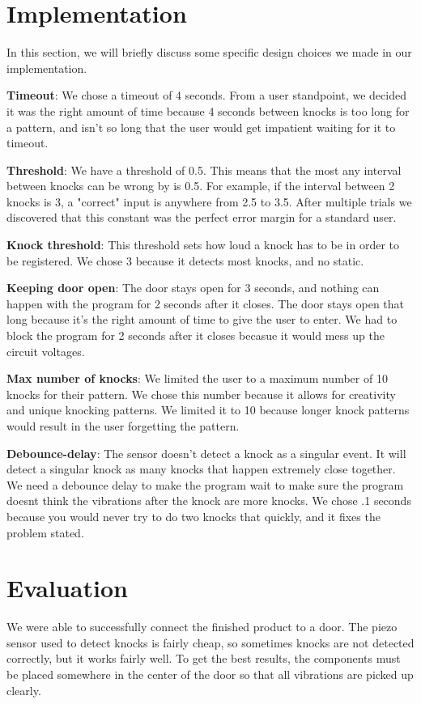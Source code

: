 \documentclass[11pt]{article}			%
\begin{document}
\section{Implementation}

In this section, we will briefly discuss some specific design choices we made in our implementation.

\textbf{Timeout}: We chose a timeout of 4 seconds. From a user standpoint, we decided it was the right amount of time because 4 seconds between knocks is too long for a pattern, and isn't so long that the user would get impatient waiting for it to timeout.

\textbf{Threshold}: We have a threshold of 0.5. This means that the most any interval between knocks can be wrong by is 0.5. For example, if the interval between 2 knocks is 3, a "correct" input is anywhere from 2.5 to 3.5. After multiple trials we discovered that this constant was the perfect error margin for a standard user.

\textbf{Knock threshold}: This threshold sets how loud a knock has to be in order to be registered. We chose 3 because it detects most knocks, and no static.

\textbf{Keeping door open}: The door stays open for 3 seconds, and nothing can happen with the program for 2 seconds after it closes. The door stays open that long because it's the right amount of time to give the user to enter. We had to block the program for 2 seconds after it closes becasue it would mess up the circuit voltages.

\textbf{Max number of knocks}: We limited the user to a maximum number of 10 knocks for their pattern. We chose this number because it allows for creativity and unique knocking patterns. We limited it to 10 because longer knock patterns would result in the user forgetting the pattern.

\textbf{Debounce-delay}: The sensor doesn't detect a knock as a singular event. It will detect a singular knock as many knocks that happen 
extremely close together. We need a debounce delay to make the program wait to make sure the program doesnt think the vibrations after the knock are more knocks. We chose .1 seconds because you would never try to do two knocks that quickly, and it fixes the problem stated.


\section{Evaluation}
We were able to successfully connect the finished product to a door.  The piezo sensor used to detect knocks is fairly cheap, so sometimes knocks are not detected correctly, but it works fairly well.  To get the best results, the components must be placed somewhere in the center of the door so that all vibrations are picked up clearly.  
\end{document}
